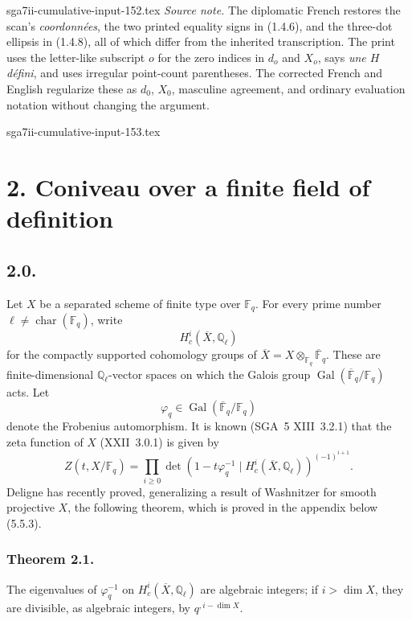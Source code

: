 \begin{filecontents*}{sga7ii-cumulative-input-152.tex}
\medskip
\noindent\emph{Source note.}
The diplomatic French restores the scan's \emph{coordonnées}, the two
printed equality signs in (1.4.6), and the three-dot ellipsis in (1.4.8),
all of which differ from the inherited transcription.  The print uses the
letter-like subscript $o$ for the zero indices in $d_o$ and $X_o$, says
\emph{une $H$ défini}, and uses irregular point-count parentheses.  The
corrected French and English regularize these as $d_0$, $X_0$, masculine
agreement, and ordinary evaluation notation without changing the argument.
\end{filecontents*}
\begin{filecontents*}{sga7ii-cumulative-input-153.tex}
\section*{2. Coniveau over a finite field of definition}

\subsection*{2.0.}
Let $X$ be a separated scheme of finite type over $\mathbb F_q$.  For every
prime number $\ell\ne\operatorname{char}(\mathbb F_q)$, write
\begin{equation}\tag{2.0.1}
H_c^i(\overline X,\mathbb Q_\ell)
\end{equation}
for the compactly supported cohomology groups of
$\overline X=X\otimes_{\mathbb F_q}\overline{\mathbb F}_q$.  These are
finite-dimensional $\mathbb Q_\ell$-vector spaces on which the Galois group
$\operatorname{Gal}(\overline{\mathbb F}_q/\mathbb F_q)$ acts.  Let
\begin{equation}\tag{2.0.2}
\varphi_q\in\operatorname{Gal}(\overline{\mathbb F}_q/\mathbb F_q)
\end{equation}
denote the Frobenius automorphism.  It is known (SGA~5 XIII~3.2.1) that the
zeta function of $X$ (XXII~3.0.1) is given by
\begin{equation}\tag{2.0.3}
Z(t,X/\mathbb F_q)=
\prod_{i\geq0}
\det\!\left(1-t\varphi_q^{-1}\mid
H_c^i(\overline X,\mathbb Q_\ell)\right)^{(-1)^{i+1}}.
\end{equation}
Deligne has recently proved, generalizing a result of Washnitzer for smooth
projective $X$, the following theorem, which is proved in the appendix below
(5.5.3).

\subsubsection*{Theorem 2.1.}
The eigenvalues of $\varphi_q^{-1}$ on
$H_c^i(\overline X,\mathbb Q_\ell)$ are algebraic integers; if
$i>\dim X$, they are divisible, as algebraic integers, by
$q^{,i-\dim X}$.


\end{filecontents*}
